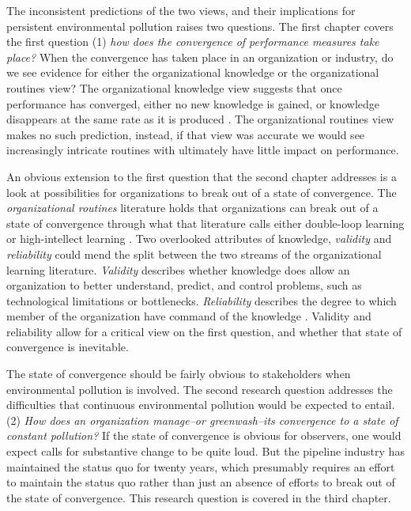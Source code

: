 The inconsistent predictions of the two views, and their implications for persistent environmental pollution raises two questions. The first chapter covers the first question (1) \textit{how does the convergence of performance measures take place?} When the convergence has taken place in an organization or industry, do we see evidence for either the organizational knowledge or the organizational routines view? The organizational knowledge view suggests that once performance has converged, either no new knowledge is gained, or knowledge disappears at the same rate as it is produced \citep{Argote2013-3}. The organizational routines view makes no such prediction, instead, if that view was accurate we would see increasingly intricate routines with ultimately have little impact on performance. 

An obvious extension to the first question that the second chapter addresses is a look at possibilities for organizations to break out of a state of convergence. The \textit{organizational routines} literature holds that organizations can break out of a state of convergence through what that literature calls either double-loop learning \citep{Argyris1978} or high-intellect learning \citep{March2010}. Two overlooked attributes of knowledge, \textit{validity} and \textit{reliability} could mend the split between the two streams of the organizational learning literature. \textit{Validity} describes whether knowledge does allow an organization to better understand, predict, and control problems, such as technological limitations or bottlenecks. \textit{Reliability} describes the degree to which member of the organization have command of the knowledge \citep{Rerup2020}. Validity and reliability allow for a critical view on the first question, and whether that state of convergence is inevitable.

The state of convergence should be fairly obvious to stakeholders when environmental pollution is involved. The second research question addresses the difficulties that continuous environmental pollution would be expected to entail. (2) \textit{How does an organization manage--or greenwash--its convergence to a state of constant pollution?} If the state of convergence is obvious for observers, one would expect calls for substantive change to be quite loud. But the pipeline industry has maintained the status quo for twenty years, which presumably requires an effort to maintain the status quo rather than just an absence of efforts to break out of the state of convergence. This research question is covered in the third chapter.

